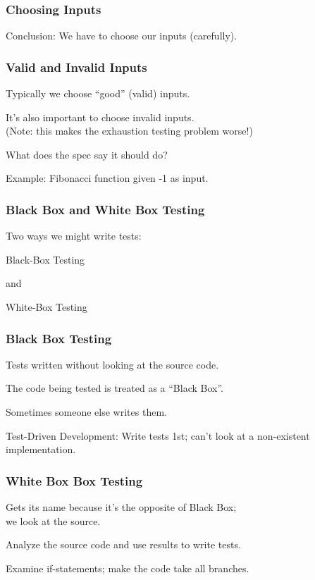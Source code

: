 \begin{frame}
\frametitle{Choosing Inputs}
\begin{changemargin}{1cm}

Conclusion: We have to choose our inputs (carefully).
\end{changemargin}
\end{frame}

\begin{frame}
\frametitle{Valid and Invalid Inputs}
\begin{changemargin}{1cm}

Typically we choose ``good'' (valid) inputs.

It's also important to choose invalid inputs.\\
\quad (Note: this makes the exhaustion testing problem worse!)

What does the spec say it should do?

Example: Fibonacci function given -1 as input. 

\end{changemargin}
\end{frame}

\begin{frame}
\frametitle{Black Box and White Box Testing}
\begin{changemargin}{1cm}

Two ways we might write tests:

\alert{Black-Box} Testing

and

\alert{White-Box} Testing

\end{changemargin}
\end{frame}

\begin{frame}
\frametitle{Black Box Testing}
\begin{changemargin}{1cm}

Tests written without looking at the source code.

The code being tested is treated as a ``Black Box''.

Sometimes someone else writes them.

Test-Driven Development: Write tests 1st; can't look at a non-existent implementation.


\end{changemargin}
\end{frame}

\begin{frame}
\frametitle{White Box Box Testing}
\begin{changemargin}{1cm}

Gets its name because it's the opposite of Black Box;\\we look at the source.

Analyze the source code and use results to write tests. 

Examine if-statements; make the code take all branches.

\end{changemargin}
\end{frame}

